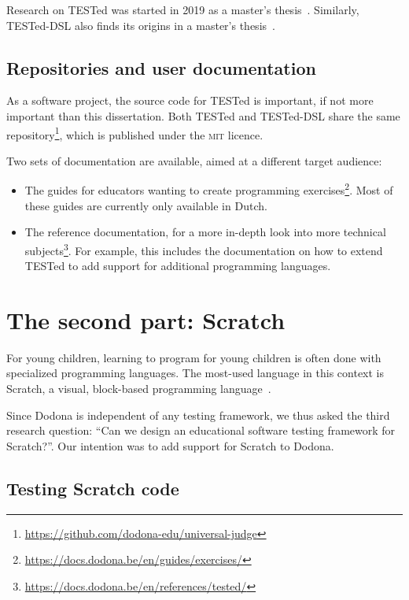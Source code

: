 \documentclass[../main]{subfiles}
\begin{document}
Research on TESTed was started in 2019 as a master's thesis~\autocite{strijbolTESTedOneJudge2020}.
Similarly, TESTed-DSL also finds its origins in a master's thesis~\autocite{selsTESTedProgrammeertaalonafhankelijkTesten2021}.

\subsection{Repositories and user documentation}\label{subsec:repositories-and-code}

As a software project, the source code for TESTed is important, if not more important than this dissertation.
Both TESTed and TESTed-DSL share the same repository\footnote{\url{https://github.com/dodona-edu/universal-judge}}, which is published under the \textsc{mit} licence.

Two sets of documentation are available, aimed at a different target audience:

\begin{itemize}
    \item The guides for educators wanting to create programming exercises\footnote{\url{https://docs.dodona.be/en/guides/exercises/}}.
    Most of these guides are currently only available in Dutch.
    \item The reference documentation, for a more in-depth look into more technical subjects\footnote{\url{https://docs.dodona.be/en/references/tested/}}.
    For example, this includes the documentation on how to extend TESTed to add support for additional programming languages.
\end{itemize}

\section{The second part: Scratch}\label{sec:the-second-part:-scratch}

For young children, learning to program for young children is often done with specialized programming languages.
The most-used language in this context is Scratch, a visual, block-based programming language~\autocite{resnickScratchProgrammingAll2009}.

Since Dodona is independent of any testing framework, we thus asked the third research question: ``Can we design an educational software testing framework for Scratch?''.
Our intention was to add support for Scratch to Dodona.

\subsection{Testing Scratch code}\label{subsec:testing-scrath-code}
\end{document}
